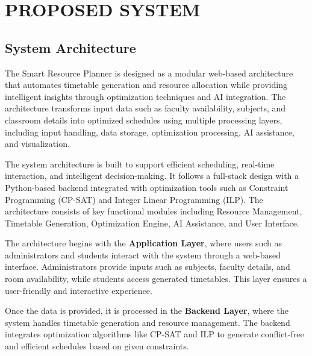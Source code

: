 \documentclass[a4paper, 12pt]{report}
\begin{document}
\chapter{PROPOSED SYSTEM}
\singlespacing

\section{System Architecture}

\par The Smart Resource Planner is designed as a modular web-based architecture that automates timetable generation and resource allocation while providing intelligent insights through optimization techniques and AI integration. The architecture transforms input data such as faculty availability, subjects, and classroom details into optimized schedules using multiple processing layers, including input handling, data storage, optimization processing, AI assistance, and visualization. \\[0.2cm]

\par The system architecture is built to support efficient scheduling, real-time interaction, and intelligent decision-making. It follows a full-stack design with a Python-based backend integrated with optimization tools such as Constraint Programming (CP-SAT) and Integer Linear Programming (ILP). The architecture consists of key functional modules including Resource Management, Timetable Generation, Optimization Engine, AI Assistance, and User Interface. \\[0.2cm]

\par The architecture begins with the \textbf{Application Layer}, where users such as administrators and students interact with the system through a web-based interface. Administrators provide inputs such as subjects, faculty details, and room availability, while students access generated timetables. This layer ensures a user-friendly and interactive experience. \\[0.2cm]

\par Once the data is provided, it is processed in the \textbf{Backend Layer}, where the system handles timetable generation and resource management. The backend integrates optimization algorithms like CP-SAT and ILP to generate conflict-free and efficient schedules based on given constraints. \\[0.2cm]
\end{document}
